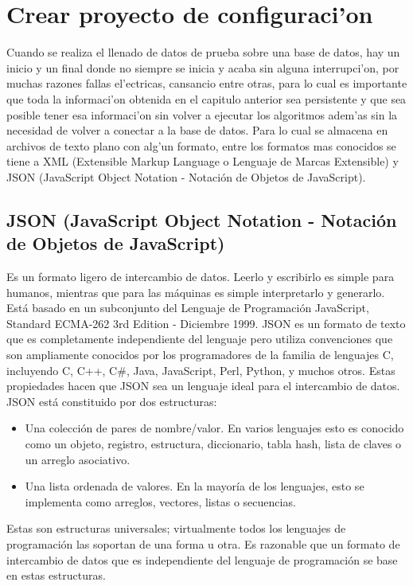 \chapter{Crear proyecto de configuraci'on}

Cuando se realiza el llenado de datos de prueba sobre una base de datos, hay un inicio y un final donde no siempre se inicia y acaba sin alguna interrupci'on, por muchas razones fallas el'ectricas, cansancio entre otras, para lo cual es importante que toda la informaci'on obtenida en el capitulo anterior sea persistente y que sea posible tener esa informaci'on sin volver a ejecutar los algoritmos adem'as sin la necesidad de volver a conectar a la base de datos.
Para lo cual se almacena en archivos de texto plano con alg'un formato, entre los formatos mas conocidos se tiene a XML (Extensible Markup Language o Lenguaje de Marcas Extensible) y JSON (JavaScript Object Notation - Notaci\'on de Objetos de JavaScript).

\section{JSON (JavaScript Object Notation - Notaci\'on de Objetos de JavaScript)}
Es un formato ligero de intercambio de datos. Leerlo y escribirlo es simple para humanos, mientras que para las m\'aquinas es simple interpretarlo y generarlo. Est\'a basado en un subconjunto del Lenguaje de Programaci\'on JavaScript, Standard ECMA-262 3rd Edition - Diciembre 1999. JSON es un formato de texto que es completamente independiente del lenguaje pero utiliza convenciones que son ampliamente conocidos por los programadores de la familia de lenguajes C, incluyendo C, C++, C\#, Java, JavaScript, Perl, Python, y muchos otros. Estas propiedades hacen que JSON sea un lenguaje ideal para el intercambio de datos.
JSON está constituido por dos estructuras:

\begin{itemize}
\item Una colecci\'on de pares de nombre/valor. En varios lenguajes esto es conocido como un objeto, registro, estructura, diccionario, tabla hash, lista de claves o un arreglo asociativo.
\item Una lista ordenada de valores. En la mayor\'ia de los lenguajes, esto se implementa como arreglos, vectores, listas o secuencias.
\end{itemize}

Estas son estructuras universales; virtualmente todos los lenguajes de programaci\'on las soportan de una forma u otra. Es razonable que un formato de intercambio de datos que es independiente del lenguaje de programaci\'on se base en estas estructuras.

